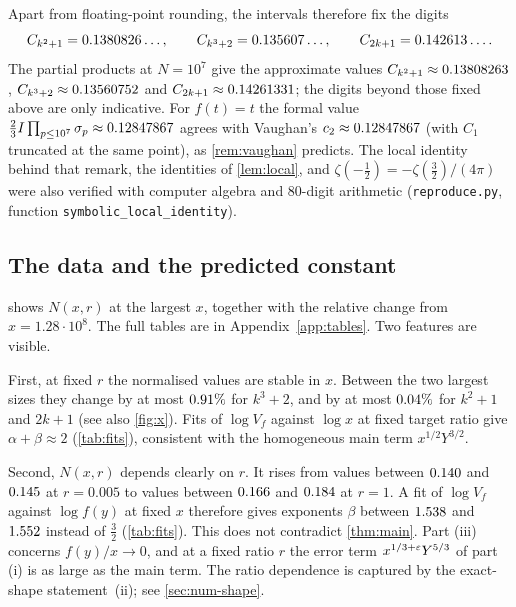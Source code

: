 Apart from floating-point rounding, the intervals therefore fix the digits
\[
C_{k^2+1}=0.1380826\ldots,\qquad C_{k^3+2}=0.135607\ldots,\qquad C_{2k+1}=0.142613\ldots .
\]
The partial products at $N=10^7$ give the approximate values $C_{k^2+1}\approx0.13808263$, $C_{k^3+2}\approx0.13560752$ and $C_{2k+1}\approx0.14261331$; the digits beyond those fixed above are only indicative. For $f(t)=t$ the formal value $\frac23I\prod_{p\le 10^7}\sigma_p\approx0.12847867$ agrees with Vaughan's $c_2\approx0.12847867$ (with $C_1$ truncated at the same point), as \cref{rem:vaughan} predicts. The local identity behind that remark, the identities of \cref{lem:local}, and $\zeta(-\frac12)=-\zeta(\frac32)/(4\pi)$ were also verified with computer algebra and $80$-digit arithmetic (\texttt{reproduce.py}, function \texttt{symbolic\_local\_identity}).

\subsection{The data and the predicted constant}\label{sec:num-data}

 shows $N(x,r)$ at the largest $x$, together with the relative change from $x=1.28\cdot10^8$. The full tables are in Appendix~\ref{app:tables}. Two features are visible.

First, at fixed $r$ the normalised values are stable in $x$. Between the two largest sizes they change by at most $0.91\%$ for $k^3+2$, and by at most $0.04\%$ for $k^2+1$ and $2k+1$ (see also \cref{fig:x}). Fits of $\log V_f$ against $\log x$ at fixed target ratio give $\alpha+\beta\approx2$ (\cref{tab:fits}), consistent with the homogeneous main term $x^{1/2}Y^{3/2}$.

Second, $N(x,r)$ depends clearly on $r$. It rises from values between $0.140$ and $0.145$ at $r=0.005$ to values between $0.166$ and $0.184$ at $r=1$. A fit of $\log V_f$ against $\log f(y)$ at fixed $x$ therefore gives exponents $\beta$ between $1.538$ and $1.552$ instead of $\frac32$ (\cref{tab:fits}). This does not contradict \cref{thm:main}. Part (iii) concerns $f(y)/x\to0$, and at a fixed ratio $r$ the error term $x^{1/3+\varepsilon}Y^{5/3}$ of part (i) is as large as the main term. The ratio dependence is captured by the exact-shape statement~(ii); see \cref{sec:num-shape}.

\begin{table}[htbp]
\centering
\footnotesize\setlength{\tabcolsep}{3.5pt}

\caption{$N(x,r)=V_f(x,y)/(x^{1/2}f(y)^{3/2})$ at $x=2.56\cdot10^8$ for the target ratios $r$ (the column $0.005$ is the diagnostic ratio). The ``change'' rows give the relative change, in percent, from $x=1.28\cdot10^8$ to $x=2.56\cdot10^8$.}
\label{tab:largest}
\end{table}

